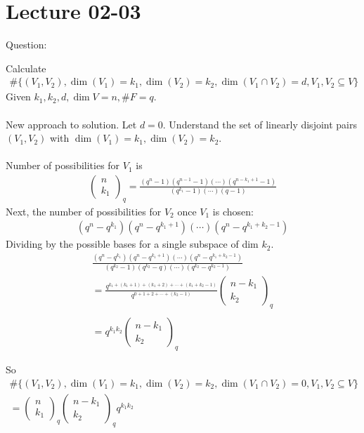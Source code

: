 \documentclass[class=scrartcl, crop=false]{standalone}
\date{2020-02-03}
\begin{document}
\section{Lecture 02-03}

Question:

Calculate 
\begin{gather*}
  \#\{(V_1, V_2), \dim(V_1) = k_1, \dim(V_2) = k_2, \dim (V_1 \cap V_2) = d, V_1, V_2 \subseteq V\} 
\end{gather*} 
Given $k_1, k_2, d, \dim V = n, \#F = q$.
\\\\
New approach to solution. Let $d = 0$. Understand the set of linearly disjoint pairs $(V_1, V_2)$ with $\dim(V_1) = k_1, \dim(V_2) = k_2$.
\\\\
Number of possibilities for $V_1$ is
\begin{gather*}
  \begin{pmatrix}
    n \\ k_1
  \end{pmatrix}_q
  = 
  \frac{(q^n - 1)(q^{n - 1} - 1)(\cdots)(q^{n - k_1 + 1} - 1)}{(q^{k_1} - 1)(\cdots)(q - 1)}
\end{gather*} 
Next, the number of possibilities for $V_2$ once $V_1$ is chosen:
\begin{gather*}
  (q^n - q^{k_1})(q^n - q^{k_1 + 1})(\cdots)(q^n - q^{k_1 + k_2 - 1})
\end{gather*} 
Dividing by the possible bases for a single subspace of dim $k_2$.
\begin{gather*}
  \frac{(q^n - q^{k_1})(q^n - q^{k_1 + 1})(\cdots)(q^n - q^{k_1 + k_2 - 1})}{(q^{k_2} - 1)(q^{k_2} - q)(\cdots)(q^{k_2} - q^{k_2 - 1})}
  \\
  = \frac{q^{k_1 + (k_1 + 1) + (k_1 + 2) + \cdots + (k_1 + k_2 - 1)}}{q^{0 + 1 + 2 + \cdots + (k_2 - 1)}}
  \begin{pmatrix}
    n - k_1 \\
    k_2
  \end{pmatrix}_q
  \\\\
  = q^{k_1k_2}
  \begin{pmatrix}
    n - k_1 \\
    k_2
  \end{pmatrix}_q
\end{gather*} 

So
\begin{gather*}
  \#\{(V_1, V_2), \dim(V_1) = k_1, \dim(V_2) = k_2, \dim (V_1 \cap V_2) = 0, V_1, V_2 \subseteq V\} 
  \\
  =
  \begin{pmatrix}
    n \\ k_1
  \end{pmatrix}_q
  \begin{pmatrix}
    n - k_1 \\ k_2
  \end{pmatrix}_q
  q^{k_1 k_2}
\end{gather*} 
\end{document}
